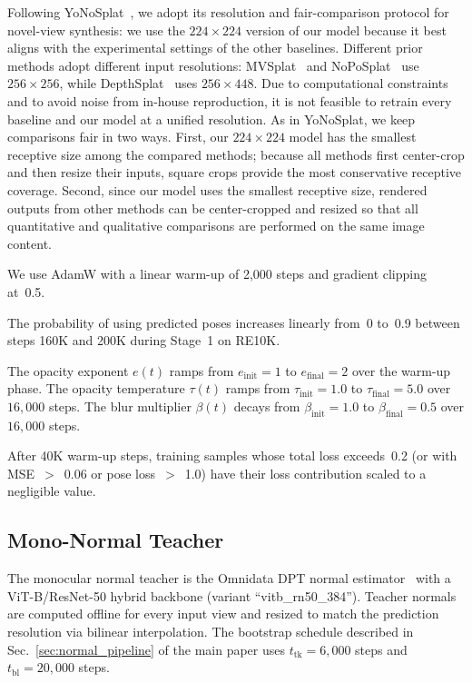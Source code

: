 Following YoNoSplat~\citep{ye2025yonosplat}, we adopt its resolution and fair-comparison protocol for novel-view synthesis: we use the $224 \times 224$ version of our model because it best aligns with the experimental settings of the other baselines. Different prior methods adopt different input resolutions: MVSplat~\citep{chen2024mvsplat} and NoPoSplat~\citep{ye2024no} use $256 \times 256$, while DepthSplat~\citep{xu2024depthsplat} uses $256 \times 448$. Due to computational constraints and to avoid noise from in-house reproduction, it is not feasible to retrain every baseline and our model at a unified resolution. As in YoNoSplat, we keep comparisons fair in two ways. First, our $224 \times 224$ model has the smallest receptive size among the compared methods; because all methods first center-crop and then resize their inputs, square crops provide the most conservative receptive coverage. Second, since our model uses the smallest receptive size, rendered outputs from other methods can be center-cropped and resized so that all quantitative and qualitative comparisons are performed on the same image content.

We use AdamW with a linear warm-up of 2{,}000 steps and gradient clipping at~0.5.

The probability of using predicted poses increases linearly from~0 to~0.9 between steps 160K and 200K during Stage~1 on RE10K.

The opacity exponent $e(t)$ ramps from $e_{\mathrm{init}} = 1$ to $e_{\mathrm{final}} = 2$ over the warm-up phase. The opacity temperature $\tau(t)$ ramps from $\tau_{\mathrm{init}} = 1.0$ to $\tau_{\mathrm{final}} = 5.0$ over $16{,}000$ steps. The blur multiplier $\beta(t)$ decays from $\beta_{\mathrm{init}} = 1.0$ to $\beta_{\mathrm{final}} = 0.5$ over $16{,}000$ steps.

After 40K warm-up steps, training samples whose total loss exceeds~0.2 (or with MSE~$>$~0.06 or pose loss~$>$~1.0) have their loss contribution scaled to a negligible value.

\subsection{Mono-Normal Teacher}
\label{sec:app_mono_teacher}

The monocular normal teacher is the Omnidata DPT normal estimator~\citep{eftekhar2021omnidata} with a ViT-B/ResNet-50 hybrid backbone (variant ``vitb\_rn50\_384''). Teacher normals are computed offline for every input view and resized to match the prediction resolution via bilinear interpolation. The bootstrap schedule described in Sec.~\ref{sec:normal_pipeline} of the main paper uses $t_{\mathrm{tk}} = 6{,}000$ steps and $t_{\mathrm{bl}} = 20{,}000$ steps.

